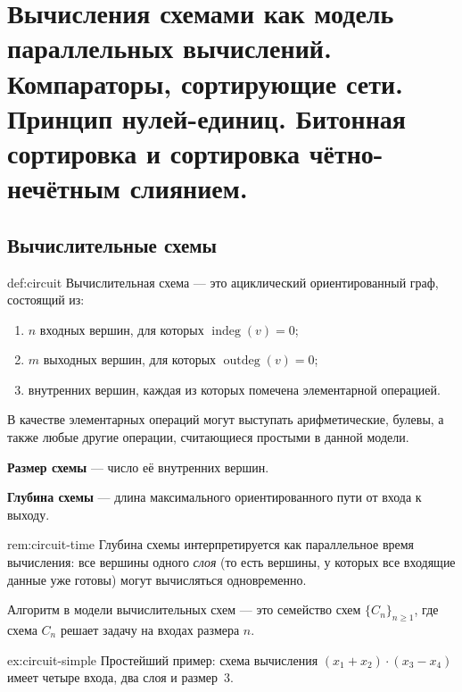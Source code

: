 

\section{Вычисления схемами как модель параллельных вычислений. Компараторы, сортирующие сети. Принцип нулей-единиц. Битонная сортировка и сортировка чётно-нечётным слиянием.}

\subsection{Вычислительные схемы}

\begin{Definition}{}{def:circuit}
	Вычислительная схема --- это ациклический ориентированный граф, состоящий из:
	\begin{enumerate}
		\item $n$ входных вершин, для которых $\operatorname{indeg}(v)=0$;
		\item $m$ выходных вершин, для которых $\operatorname{outdeg}(v)=0$;
		\item внутренних вершин, каждая из которых помечена элементарной операцией.
	\end{enumerate}
	В качестве элементарных операций могут выступать арифметические, булевы, а также любые другие операции, считающиеся простыми в данной модели.
	
	\medskip\noindent
	\textbf{Размер схемы} --- число её внутренних вершин.
	
	\medskip\noindent
	\textbf{Глубина схемы} --- длина максимального ориентированного пути от входа к выходу.
\end{Definition}

\begin{Remark}{}{rem:circuit-time}
	Глубина схемы интерпретируется как параллельное время вычисления: все вершины одного \emph{слоя} (то есть вершины, у которых все входящие данные уже готовы) могут вычисляться одновременно.
\end{Remark}

Алгоритм в модели вычислительных схем --- это семейство схем $\{C_n\}_{n\ge 1}$, где схема $C_n$ решает задачу на входах размера $n$.

\begin{Example}{}{ex:circuit-simple}
	Простейший пример: схема вычисления $(x_1+x_2)\cdot(x_3 - x_4)$ имеет четыре входа, два слоя и размер~$3$.
\end{Example}



